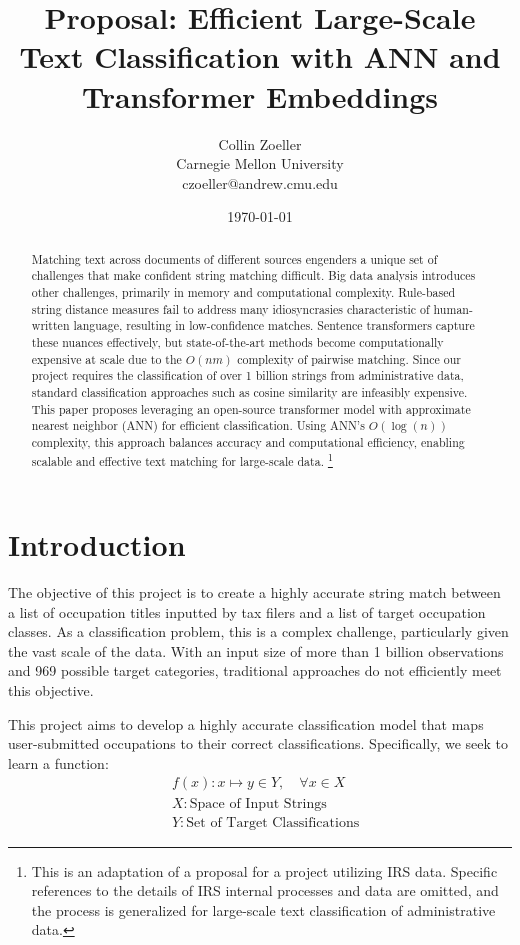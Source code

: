 \documentclass[12pt]{article}
\title{\textbf{Proposal: Efficient Large-Scale Text Classification with ANN and Transformer Embeddings}}
\author{Collin Zoeller \\ Carnegie Mellon University \\ czoeller@andrew.cmu.edu}
\date{\today}
\begin{document}
\maketitle

\begin{abstract}
Matching text across documents of different sources engenders a unique set of challenges that make confident string matching difficult. Big data analysis introduces other challenges, primarily in memory and computational complexity. Rule-based string distance measures fail to address many idiosyncrasies characteristic of human-written language, resulting in low-confidence matches. Sentence transformers capture these nuances effectively, but state-of-the-art methods become computationally expensive at scale due to the $O(nm)$ complexity of pairwise matching. Since our project requires the classification of over 1 billion strings from administrative data, standard classification approaches such as cosine similarity are infeasibly expensive. 
This paper proposes leveraging an open-source transformer model with approximate nearest neighbor (ANN) for efficient classification. Using ANN’s $O(\log(n))$ complexity, this approach balances accuracy and computational efficiency, enabling scalable and effective text matching for large-scale data.
\footnote{This is an adaptation of a proposal for a project utilizing IRS data. Specific references to the details of IRS internal processes and data are omitted, and the process is generalized for large-scale text classification of administrative data.}  
\end{abstract}
\clearpage
\section{Introduction}\label{sec:intro}

The objective of this project is to create a highly accurate string match between a list of occupation titles inputted by tax filers and a list of target occupation classes.  As a classification problem, this is a complex challenge, particularly given the vast scale of the data. With an input size of more than 1 billion observations and 969 possible target categories, traditional approaches do not efficiently meet this objective. 

This project aims to develop a highly accurate classification model that maps user-submitted occupations to their correct classifications. Specifically, we seek to learn a function:
\begin{align*}
   &f(x): x \mapsto y \in Y, \quad \forall x \in X\\
    &X:  \text{Space of Input Strings}\\
    &Y: \text{Set of Target Classifications}
\end{align*}
\end{document}
